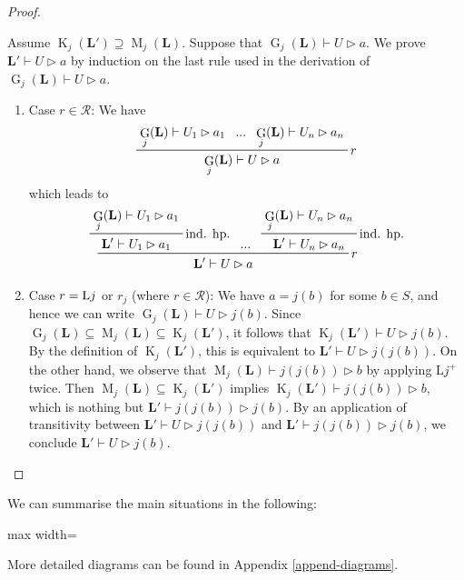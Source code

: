 \documentclass[runningheads]{llncs}
\renewcommand{\L}{\mathbf{L}}
\DeclareMathOperator{\Glivenko}{G}
\DeclareMathOperator{\Kleisli}{K}
\DeclareMathOperator{\Maximal}{M}
\begin{document}
\begin{proof}
\begin{enumerate}
		Assume $\Kleisli_j(\L')\supseteq\Maximal_j(\L)$. 
		Suppose that $\Glivenko_j(\L)\vdash U\rhd a$. We prove $\L'\vdash U\rhd a$ by induction on the last rule used in the derivation of $\Glivenko_j(\L)\vdash U\rhd a$.
		\begin{enumerate}
			\item Case $r\in \mathcal{R}$:
			We have
			\[
			\prftree[r]{\textnormal{$r$}}{\Glivenko_j(\L)\vdash U_1\rhd a_1}{...}{\Glivenko_j(\L)\vdash U_n\rhd a_n}{\Glivenko_j(\L)\vdash U\rhd a}
			\]
			which leads to
			\[
			\prftree[r]{\textnormal{$r$}}{
				\prftree[r]{ind. hp.}{\Glivenko_j(\L)\vdash U_1\rhd a_1}{\L'\vdash U_1\rhd a_1}
			}{...}{
				\prftree[r]{ind. hp.}{\Glivenko_j(\L)\vdash U_n\rhd a_n}{\L'\vdash U_n\rhd a_n}
			}{\L'\vdash U\rhd a}
			\]
			\item Case $r=\textnormal{L$j$}$ or $r_j$ (where $r\in \mathcal{R}$): We have $a = j(b)$ for some $b \in S$, and hence we can write $\Glivenko_j(\L) \vdash U \rhd j(b)$. Since $\Glivenko_j(\L) \subseteq \Maximal_j(\L) \subseteq \Kleisli_j(\L')$, it follows that $\Kleisli_j(\L') \vdash U \rhd j(b)$. By the definition of $\Kleisli_j(\L')$, this is equivalent to $\L' \vdash U \rhd j(j(b))$. 
			On the other hand, we observe that $\Maximal_j(\L)\vdash j(j(b))\rhd b$ by applying L$j^+$ twice. Then $\Maximal_j(\L)\subseteq\Kleisli_j(\L')$ implies $\Kleisli_j(\L')\vdash j(j(b))\rhd b$, which is nothing but $\L'\vdash j(j(b))\rhd j(b)$.
			By an application of transitivity between $\L' \vdash U \rhd j(j(b))$ and $\L'\vdash j(j(b))\rhd j(b)$, we conclude $\L' \vdash U \rhd j(b)$.
			\qedhere
		\end{enumerate}
	\end{enumerate}
\end{proof}

We can summarise the main situations in the following:

\begin{center}
\begin{adjustbox}{max width=\textwidth}
\end{adjustbox}
\end{center}
More detailed diagrams can be found in Appendix \ref{append-diagrams}.
\end{document}
